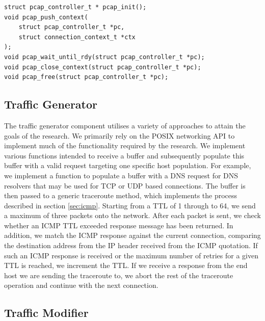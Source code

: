 \documentclass{l4proj}
\begin{document}
\begin{lstlisting}[caption={The exported API of the traffic capture component to facilitate the live capture of traffic generated by the system.}, label={lst:pcapapi}]
struct pcap_controller_t * pcap_init();
void pcap_push_context(
    struct pcap_controller_t *pc,
    struct connection_context_t *ctx
);
void pcap_wait_until_rdy(struct pcap_controller_t *pc);
void pcap_close_context(struct pcap_controller_t *pc);
void pcap_free(struct pcap_controller_t *pc);

\end{lstlisting}

\subsection{Traffic Generator}
\label{sec:impltg}

The traffic generator component utilises a variety of approaches to attain the goals of the research. We primarily rely on the POSIX networking API to implement much of the functionality required by the research. We implement various functions intended to receive a buffer and subsequently populate this buffer with a valid request targeting one specific host population. For example, we implement a function to populate a buffer with a DNS request for DNS resolvers that may be used for TCP or UDP based connections. The buffer is then passed to a generic traceroute method, which implements the process described in section \ref{sec:icmp}. Starting from a TTL of 1 through to 64, we send a maximum of three packets onto the network. After each packet is sent, we check whether an ICMP TTL exceeded response message has been returned. In addition, we match the ICMP response against the current connection, comparing the destination address from the IP header received from the ICMP quotation. If such an ICMP response is received or the maximum number of retries for a given TTL is reached, we increment the TTL. If we receive a response from the end host we are sending the traceroute to, we abort the rest of the traceroute operation and continue with the next connection.

\subsection{Traffic Modifier}

\end{document}
